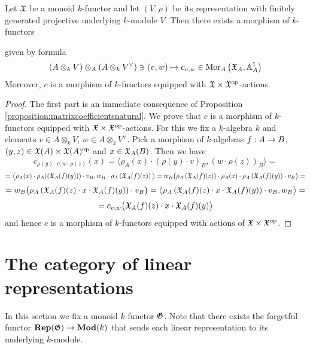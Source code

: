 \begin{corollary}\label{corollary:matrixcoefficientsnatural}
Let ${\mathfrak X}$ be a monoid $k$-functor and let $(V,\rho)$ be its representation with finitely generated projective underlying $k$-module $V$. Then there exists a morphism of $k$-functors
\begin{center}
\end{center}
given by formula
$$\left(A\otimes_kV\right)\otimes_A\left(A\otimes_kV^{\vee}\right)\ni (v,w)\mapsto c_{v,w}\in \mathrm{Mor}_A\left({\mathfrak X}_A,\mathbb{A}^1_A\right)$$
Moreover, $c$ is a morphism of $k$-functors equipped with ${\mathfrak X} \times {\mathfrak X}^{\mathrm{op}}$-actions.
\end{corollary}
\begin{proof}
The first part is an immediate consequence of Proposition \ref{proposition:matrixcoefficientsnatural}. We prove that $c$ is a morphism of $k$-functors equipped with ${\mathfrak X}\times {\mathfrak X}^{\mathrm{op}}$-actions. For this we fix a $k$-algebra $k$ and elements $v\in A\otimes_kV$, $w\in A\otimes_kV^{\vee}$. Pick a morphism of $k$-algebras $f:A\rightarrow B$, $(y,z)\in {\mathfrak X}(A)\times {\mathfrak X}(A)^{\mathrm{op}}$ and $x\in {\mathfrak X}_A(B)$. Then we have 
$$c_{\rho(y)\cdot v,w\cdot \rho(z)}(x) = \big\langle \rho_A(x)\cdot \left(\rho(y)\cdot v\right)_B, \left(w\cdot \rho(z)\right)_B \big\rangle =$$
$$= \big\langle \rho_A(x)\cdot \rho_A(\left({\mathfrak X}_A(f)(y)\right))\cdot v_B, w_B\cdot \rho_A\left({\mathfrak X}_A(f)(z)\right) \big\rangle = w_B\big(\rho_A\left({\mathfrak X}_A(f)(z)\right)\cdot \rho_A(x)\cdot \rho_A\left({\mathfrak X}_A(f)(y)\right)\cdot v_B \big)=$$
$$= w_B\big(\rho_A\left({\mathfrak X}_A(f)(z) \cdot x \cdot {\mathfrak X}_A(f)(y)\right)\cdot v_B \big) = \big\langle \rho_A\left({\mathfrak X}_A(f)(z) \cdot x \cdot {\mathfrak X}_A(f)(y)\right)\cdot v_B, w_B \big\rangle =  $$
$$= c_{v,w}\big({\mathfrak X}_A(f)(z) \cdot x \cdot {\mathfrak X}_A(f)(y)\big)$$
and hence $c$ is a morphism of $k$-functors equipped with actions of ${\mathfrak X}\times {\mathfrak X}^{\mathrm{op}}$.
\end{proof}

\section{The category of linear representations}
\noindent
In this section we fix a monoid $k$-functor ${\mathfrak G}$. Note that there exists the forgetful functor $\mathbf{Rep}({\mathfrak G})\rightarrow \mathbf{Mod}(k)$ that sends each linear representation to its underlying $k$-module.

